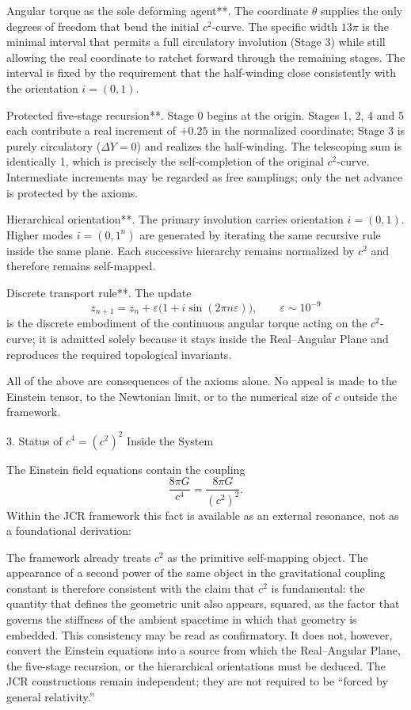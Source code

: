 Angular torque as the sole deforming agent**.  
  The coordinate \(\theta\) supplies the only degrees of freedom that bend the initial \(c^2\)-curve. The specific width \(13\pi\) is the minimal interval that permits a full circulatory involution (Stage 3) while still allowing the real coordinate to ratchet forward through the remaining stages. The interval is fixed by the requirement that the half-winding close consistently with the orientation \(i=(0,1)\).

Protected five-stage recursion**.  
  Stage 0 begins at the origin. Stages 1, 2, 4 and 5 each contribute a real increment of \(+0.25\) in the normalized coordinate; Stage 3 is purely circulatory (\(\Delta Y=0\)) and realizes the half-winding. The telescoping sum is identically 1, which is precisely the self-completion of the original \(c^2\)-curve. Intermediate increments may be regarded as free samplings; only the net advance is protected by the axioms.

Hierarchical orientation**.  
  The primary involution carries orientation \(i=(0,1)\). Higher modes \(i=(0,1^n)\) are generated by iterating the same recursive rule inside the same plane. Each successive hierarchy remains normalized by \(c^2\) and therefore remains self-mapped.

Discrete transport rule**.  
  The update  
  \[
  z_{n+1}=z_n+\varepsilon\bigl(1+i\sin(2\pi n\varepsilon)\bigr),\qquad\varepsilon\sim10^{-9}
  \]
  is the discrete embodiment of the continuous angular torque acting on the \(c^2\)-curve; it is admitted solely because it stays inside the Real–Angular Plane and reproduces the required topological invariants.

All of the above are consequences of the axioms alone. No appeal is made to the Einstein tensor, to the Newtonian limit, or to the numerical size of \(c\) outside the framework.

3. Status of \(c^4=(c^2)^2\) Inside the System

The Einstein field equations contain the coupling  
\[
\frac{8\pi G}{c^4}=\frac{8\pi G}{(c^2)^2}.
\]
Within the JCR framework this fact is available as an external resonance, not as a foundational derivation:

The framework already treats \(c^2\) as the primitive self-mapping object.  
The appearance of a second power of the same object in the gravitational coupling constant is therefore consistent with the claim that \(c^2\) is fundamental: the quantity that defines the geometric unit also appears, squared, as the factor that governs the stiffness of the ambient spacetime in which that geometry is embedded.  
This consistency may be read as confirmatory. It does not, however, convert the Einstein equations into a source from which the Real–Angular Plane, the five-stage recursion, or the hierarchical orientations must be deduced. The JCR constructions remain independent; they are not required to be “forced by general relativity.”

